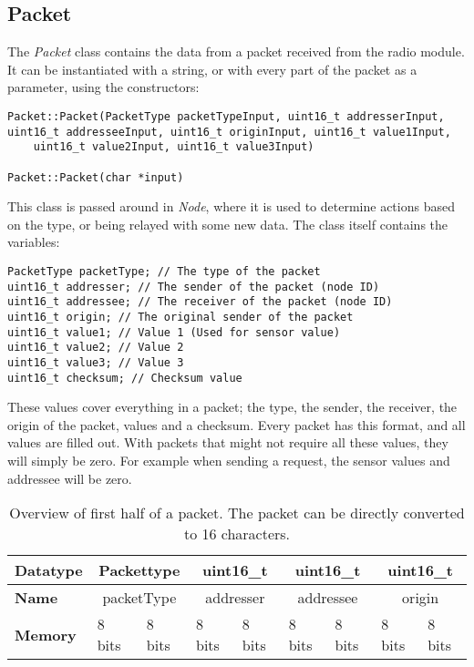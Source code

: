 \subsection{Packet}
The \textit{Packet} class contains the data from a packet received from the radio module. It can be instantiated with a string, or with every part of the packet as a parameter, using the constructors:
\begin{lstlisting}
Packet::Packet(PacketType packetTypeInput, uint16_t addresserInput, uint16_t addresseeInput, uint16_t originInput, uint16_t value1Input,
	uint16_t value2Input, uint16_t value3Input)
	
Packet::Packet(char *input)
\end{lstlisting}


This class is passed around in \textit{Node}, where it is used to determine actions based on the type, or being relayed with some new data. 
The class itself contains the variables:
\begin{lstlisting}
PacketType packetType; // The type of the packet
uint16_t addresser; // The sender of the packet (node ID)
uint16_t addressee; // The receiver of the packet (node ID)
uint16_t origin; // The original sender of the packet
uint16_t value1; // Value 1 (Used for sensor value)
uint16_t value2; // Value 2
uint16_t value3; // Value 3
uint16_t checksum; // Checksum value
\end{lstlisting}
These values cover everything in a packet; the type, the sender, the receiver, the origin of the packet, values and a checksum.
Every packet has this format, and all values are filled out. With packets that might not require all these values, they will simply be zero. For example when sending a request, the sensor values and addressee will be zero.

\begin{table}[]
\centering
\begin{tabular}{|l|c|l|c|l|c|l|c|l|}
\hline
\textbf{Datatype} & \multicolumn{2}{c|}{Packettype}      & \multicolumn{2}{c|}{uint16\_t}       & \multicolumn{2}{c|}{uint16\_t}       & \multicolumn{2}{c|}{uint16\_t}       \\ \hline
\textbf{Name}     & \multicolumn{2}{c|}{packetType}      & \multicolumn{2}{c|}{addresser}       & \multicolumn{2}{c|}{addressee}       & \multicolumn{2}{c|}{origin}          \\ \hline
\textbf{Memory}   & \multicolumn{1}{l|}{8 bits} & 8 bits & \multicolumn{1}{l|}{8 bits} & 8 bits & \multicolumn{1}{l|}{8 bits} & 8 bits & \multicolumn{1}{l|}{8 bits} & 8 bits \\ \hline
\end{tabular}
\caption{Overview of first half of a packet. The packet can be directly converted to 16 characters.}
\label{tab:packetTableFirst}
\end{table}

